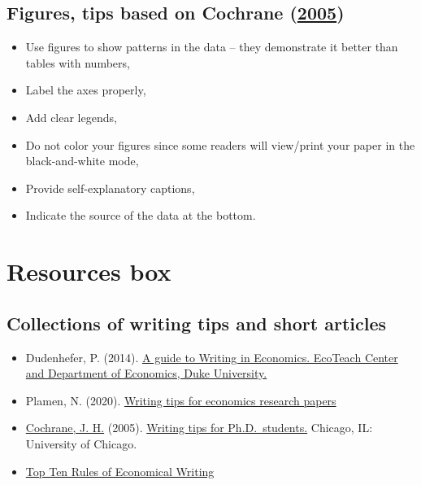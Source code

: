 \documentclass[
]{book}
\providecommand{\tightlist}{%
  \setlength{\itemsep}{0pt}\setlength{\parskip}{0pt}}
\begin{document}
\hypertarget{figures-tips-based-on-cochrane_writing_2005}{%
\subsection{\texorpdfstring{Figures, tips based on Cochrane
(\protect\hyperlink{ref-cochrane_writing_2005}{2005})}{Figures, tips based on Cochrane (2005)}}\label{figures-tips-based-on-cochrane_writing_2005}}

\begin{itemize}
\tightlist
\item
  Use figures to show patterns in the data -- they demonstrate it better
  than tables with numbers,
\item
  Label the axes properly,
\item
  Add clear legends,
\item
  Do not color your figures since some readers will view/print your
  paper in the black-and-white mode,
\item
  Provide self-explanatory captions,
\item
  Indicate the source of the data at the bottom.
\end{itemize}

\hypertarget{resources-box-5}{%
\section{Resources box}\label{resources-box-5}}

\hypertarget{collections-of-writing-tips-and-short-articles}{%
\subsection{Collections of writing tips and short
articles}\label{collections-of-writing-tips-and-short-articles}}

\begin{itemize}
\tightlist
\item
  Dudenhefer, P. (2014).
  \href{https://econ.duke.edu/sites/econ.duke.edu/files/file-attachments/Dudenhefer\%2C\%20Paul\%20-\%20Guide\%20to\%20Writing\%20in\%20Economics.pdf}{A
  guide to Writing in Economics. EcoTeach Center and Department of
  Economics, Duke University.}
\item
  Plamen, N. (2020).
  \href{https://mpra.ub.uni-muenchen.de/105088/1/MPRA_paper_105088.pdf}{Writing
  tips for economics research papers}
\item
  \href{https://www.johnhcochrane.com/}{Cochrane, J. H.} (2005).
  \href{http://mayoral.iae-csic.org/timeseries_bgse13/phd_paper_writing.pdf}{Writing
  tips for Ph.D.~students.} Chicago, IL: University of Chicago.
\item
  \href{http://www3.nccu.edu.tw/~jthuang/rules.html}{Top Ten Rules of
  Economical Writing}
\end{itemize}
\end{document}
